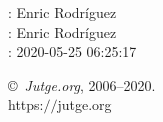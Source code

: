 \documentclass[11pt]{article}
\begin{document}
    \newcommand{\SampleTwoCol}{\SampleTwoColInputOutput{sample}{}}
    \newcommand{\SampleOneCol}{\SampleOneColInputOutput{sample}{}}

    \ProblemInformation
    \Author: Enric Rodríguez\\    \Translator: Enric Rodríguez\\
    \Generation: 2020-05-25 06:25:17

    \bigskip

    \copyright\ \emph{Jutge.org}, 2006--2020. \\
    https:$/\!\!/$jutge.org
\end{document}

